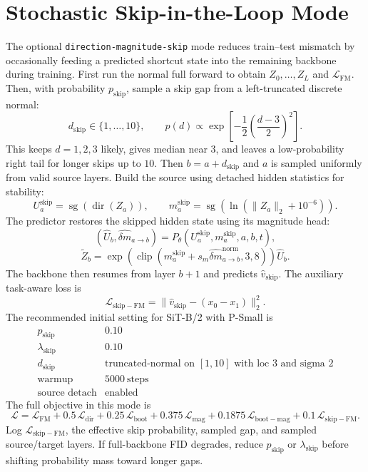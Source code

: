 \documentclass[11pt]{article}
\begin{document}
\section{Stochastic Skip-in-the-Loop Mode}
The optional \texttt{direction-magnitude-skip} mode reduces train--test
mismatch by occasionally feeding a predicted shortcut state into the remaining
backbone during training. First run the normal full forward to obtain
$Z_0,\ldots,Z_L$ and $\mathcal{L}_{\mathrm{FM}}$. Then, with probability
$p_{\mathrm{skip}}$, sample a skip gap from a left-truncated discrete normal:
\[
    d_{\mathrm{skip}}\in\{1,\ldots,10\},\qquad
    p(d)\propto
    \exp\left[-\frac{1}{2}\left(\frac{d-3}{2}\right)^2\right].
\]
This keeps $d=1,2,3$ likely, gives median near $3$, and leaves a low-probability
right tail for longer skips up to $10$. Then $b=a+d_{\mathrm{skip}}$ and
$a$ is sampled uniformly from valid source layers. Build the source using
detached hidden statistics for stability:
\[
    U_a^{\mathrm{skip}}=\operatorname{sg}(\operatorname{dir}(Z_a)),\qquad
    m_a^{\mathrm{skip}}=\operatorname{sg}(\ln(\|Z_a\|_2+10^{-6})).
\]
The predictor restores the skipped hidden state using its magnitude head:
\[
    (\hat U_b,\hat{\delta m}_{a\rightarrow b})
    =
    P_\theta(U_a^{\mathrm{skip}},m_a^{\mathrm{skip}},a,b,t),
\]
\[
    \tilde Z_b
    =
    \exp\!\left(\operatorname{clip}\left(
    m_a^{\mathrm{skip}}+s_m\hat{\delta m}_{a\rightarrow b}^{\mathrm{norm}},
    3,8\right)\right)\hat U_b .
\]
The backbone then resumes from layer $b+1$ and predicts
$\hat v_{\mathrm{skip}}$. The auxiliary task-aware loss is
\[
    \mathcal{L}_{\mathrm{skip-FM}}
    =
    \|\hat v_{\mathrm{skip}}-(x_0-x_1)\|_2^2.
\]
The recommended initial setting for SiT-B/2 with P-Small is
\[
\begin{array}{ll}
p_{\mathrm{skip}} & 0.10 \\
\lambda_{\mathrm{skip}} & 0.10 \\
d_{\mathrm{skip}} & \text{truncated-normal on }[1,10]\text{ with loc }3\text{ and sigma }2 \\
\text{warmup} & 5000\ \text{steps} \\
\text{source detach} & \text{enabled}
\end{array}
\]
The full objective in this mode is
\[
    \boxed{
    \mathcal{L}
    =
    \mathcal{L}_{\mathrm{FM}}
    +0.5\,\mathcal{L}_{\mathrm{dir}}
    +0.25\,\mathcal{L}_{\mathrm{boot}}
    +0.375\,\mathcal{L}_{\mathrm{mag}}
    +0.1875\,\mathcal{L}_{\mathrm{boot-mag}}
    +0.1\,\mathcal{L}_{\mathrm{skip-FM}}
    }.
\]
Log $\mathcal{L}_{\mathrm{skip-FM}}$, the effective skip probability, sampled
gap, and sampled source/target layers. If full-backbone FID degrades, reduce
$p_{\mathrm{skip}}$ or $\lambda_{\mathrm{skip}}$ before shifting probability
mass toward longer gaps.
\end{document}

